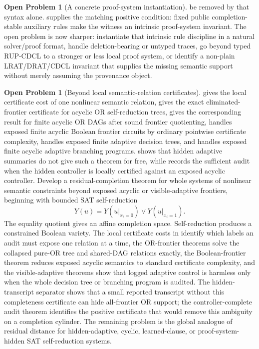 \documentclass[11pt]{article}
\theoremstyle{definition}
\newtheorem{openproblem}[theorem]{Open Problem}
\begin{document}
\begin{openproblem}[A concrete proof-system instantiation]
be removed by that syntax alone.   supplies the matching positive condition: fixed public completion-stable auxiliary rules make the witness an intrinsic proof-system invariant.  The open problem is now sharper: instantiate that intrinsic rule discipline in a natural solver/proof format, handle deletion-bearing or untyped traces, go beyond typed RUP-CDCL to a stronger or less local proof system, or identify a non-plain LRAT/DRAT/CDCL invariant that supplies the missing semantic support without merely assuming the provenance object.
\end{openproblem}

\begin{openproblem}[Beyond local semantic-relation certificates]\label{op:nonlinear}
 gives the local certificate cost of one nonlinear semantic relation,  gives the exact eliminated-frontier certificate for acyclic OR self-reduction trees,  gives the corresponding result for finite acyclic OR DAGs after sound frontier quotienting,  handles exposed finite acyclic Boolean frontier circuits by ordinary pointwise certificate complexity,  handles exposed finite adaptive decision trees, and  handles exposed finite acyclic adaptive branching programs.   shows that hidden adaptive summaries do not give such a theorem for free, while  records the sufficient audit when the hidden controller is locally certified against an exposed acyclic controller.  Develop a residual-completion theorem for whole systems of nonlinear semantic constraints beyond exposed acyclic or visible-adaptive frontiers, beginning with bounded SAT self-reduction
\[
  Y(u)=Y(u|_{x_i=0})\vee Y(u|_{x_i=1}).
\]
The equality quotient gives an affine completion space.  Self-reduction produces a constrained Boolean variety.  The local certificate costs in  identify which labels an audit must expose one relation at a time, the OR-frontier theorems solve the collapsed pure-OR tree and shared-DAG relations exactly, the Boolean-frontier theorem reduces exposed acyclic semantics to standard certificate complexity, and the visible-adaptive theorems show that logged adaptive control is harmless only when the whole decision tree or branching program is audited.  The hidden-transcript separator shows that a small reported transcript without this completeness certificate can hide all-frontier OR support; the controller-complete audit theorem identifies the positive certificate that would remove this ambiguity on a completion cylinder.  The remaining problem is the global analogue of residual distance for hidden-adaptive, cyclic, learned-clause, or proof-system-hidden SAT self-reduction systems.
\end{openproblem}
\end{document}
